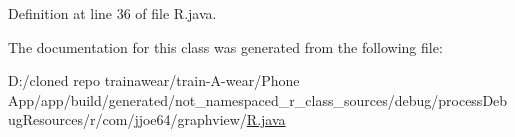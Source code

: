 Definition at line 36 of file R.\+java.



The documentation for this class was generated from the following file\+:\begin{DoxyCompactItemize}
\item 
D\+:/cloned repo trainawear/train-\/\+A-\/wear/\+Phone App/app/build/generated/not\+\_\+namespaced\+\_\+r\+\_\+class\+\_\+sources/debug/process\+Debug\+Resources/r/com/jjoe64/graphview/\mbox{\hyperlink{process_debug_resources_2r_2com_2jjoe64_2graphview_2_r_8java}{R.\+java}}\end{DoxyCompactItemize}
